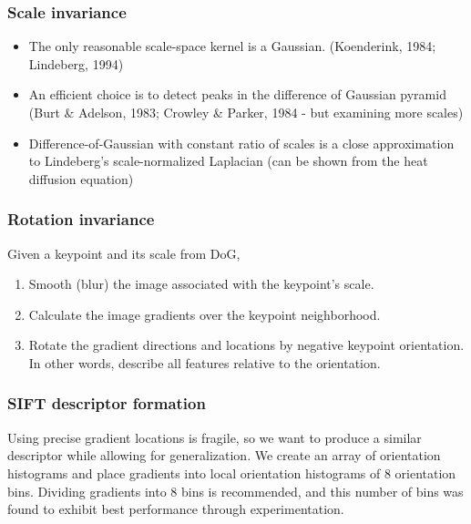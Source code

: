 \documentclass{article}
\begin{document}
\subsubsection{Scale invariance}
\begin{itemize}
  \item The only reasonable scale-space kernel is a Gaussian. (Koenderink, 1984; Lindeberg, 1994)
  \item An efficient choice is to detect peaks in the difference of Gaussian pyramid (Burt \& Adelson, 1983; Crowley \& Parker, 1984 - but examining more scales)
  \item Difference-of-Gaussian with constant ratio of scales is a close approximation to Lindeberg's scale-normalized Laplacian (can be shown from the heat diffusion equation)
\end{itemize}

\subsubsection{Rotation invariance}
Given a keypoint and its scale from DoG,
\begin{enumerate}
  \item Smooth (blur) the image associated with the keypoint's scale.
  \item Calculate the image gradients over the keypoint neighborhood.
  \item Rotate the gradient directions and locations by negative keypoint orientation. In other words, describe all features relative to the orientation.
\end{enumerate}

\subsubsection{SIFT descriptor formation}
Using precise gradient locations is fragile, so we want to produce a similar descriptor while allowing for generalization. We create an array of orientation histograms and place gradients into local orientation histograms of 8 orientation bins. Dividing gradients into 8 bins is recommended, and this number of bins was found to exhibit best performance through experimentation.
\end{document}
